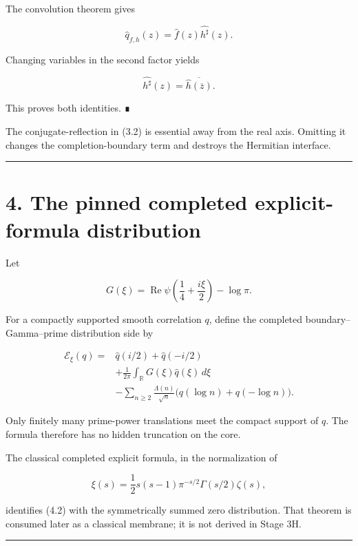The convolution theorem gives

\[
\widehat q_{f,h}(z)
=\widehat f(z)\widehat{h^\sharp}(z).
\]

Changing variables in the second factor yields

\[
\widehat{h^\sharp}(z)
=\overline{\widehat h(\overline z)}.
\]

This proves both identities. ∎

The conjugate-reflection in (3.2) is essential away from the real axis. Omitting
it changes the completion-boundary term and destroys the Hermitian interface.

\begin{center}\rule{0.5\linewidth}{0.5pt}\end{center}

\hypertarget{the-pinned-completed-explicit-formula-distribution}{%
\section{4. The pinned completed explicit-formula distribution}\label{the-pinned-completed-explicit-formula-distribution}}

Let

\[
G(\xi)
=
\operatorname{Re}\psi\!\left(\frac14+\frac{i\xi}{2}\right)
-\log\pi.
\tag{4.1}
\]

For a compactly supported smooth correlation \(q\), define the completed
boundary--Gamma--prime distribution side by

\[
\boxed{
\begin{aligned}
\mathcal E_\xi(q)
={}&\widehat q(i/2)+\widehat q(-i/2)\\
&+\frac1{2\pi}\int_{\mathbb R}G(\xi)\widehat q(\xi)\,d\xi\\
&-\sum_{n\ge2}\frac{\Lambda(n)}{\sqrt n}
\bigl(q(\log n)+q(-\log n)\bigr).
\end{aligned}
}
\tag{4.2}
\]

Only finitely many prime-power translations meet the compact support of \(q\).
The formula therefore has no hidden truncation on the core.

The classical completed explicit formula, in the normalization of

\[
\xi(s)
=\frac12s(s-1)\pi^{-s/2}\Gamma(s/2)\zeta(s),
\]

identifies (4.2) with the symmetrically summed zero distribution. That theorem
is consumed later as a classical membrane; it is not derived in Stage 3H.

\begin{center}\rule{0.5\linewidth}{0.5pt}\end{center}

